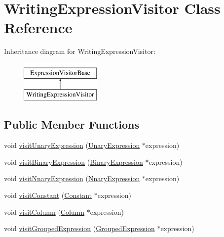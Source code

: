 \hypertarget{class_writing_expression_visitor}{\section{Writing\+Expression\+Visitor Class Reference}
\label{class_writing_expression_visitor}
}
Inheritance diagram for Writing\+Expression\+Visitor\+:\begin{figure}[H]
\begin{center}
\leavevmode
\includegraphics[height=2.000000cm]{class_writing_expression_visitor}
\end{center}
\end{figure}
\subsection*{Public Member Functions}
\begin{DoxyCompactItemize}
\item 
void \hyperlink{class_writing_expression_visitor_ae9e2e5b8ba44dbde0d8e9461df5add9b}{visit\+Unary\+Expression} (\hyperlink{class_unary_expression}{Unary\+Expression} $\ast$expression)
\item 
void \hyperlink{class_writing_expression_visitor_ad6302b69c3d050b280d10449eb90ee47}{visit\+Binary\+Expression} (\hyperlink{class_binary_expression}{Binary\+Expression} $\ast$expression)
\item 
void \hyperlink{class_writing_expression_visitor_a36c7ec04fda1f4b5435259331669d11a}{visit\+Nnary\+Expression} (\hyperlink{class_nnary_expression}{Nnary\+Expression} $\ast$expression)
\item 
void \hyperlink{class_writing_expression_visitor_aff9e80097dbb4d0f08e2052cd7146371}{visit\+Constant} (\hyperlink{class_constant}{Constant} $\ast$expression)
\item 
void \hyperlink{class_writing_expression_visitor_ac2a8314129b6b238a184b3d6f6fa40c0}{visit\+Column} (\hyperlink{class_column}{Column} $\ast$expression)
\item 
void \hyperlink{class_writing_expression_visitor_adcd079cbe5995822236c5b9fdb4b0532}{visit\+Grouped\+Expression} (\hyperlink{class_grouped_expression}{Grouped\+Expression} $\ast$expression)
\end{DoxyCompactItemize}
